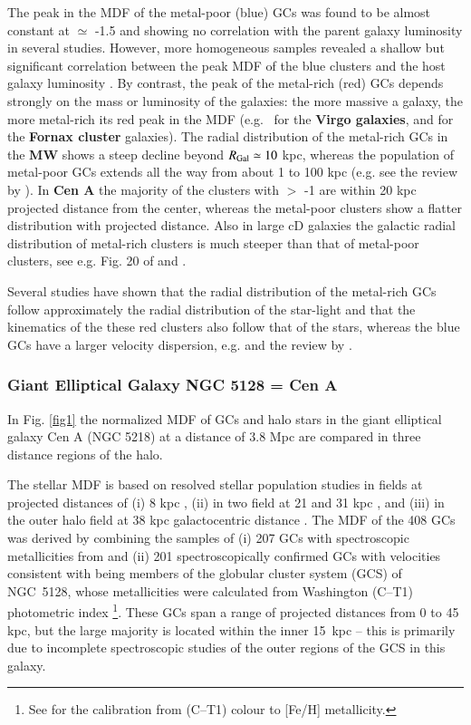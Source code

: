 \documentclass{aa}
\begin{document}
The peak in the MDF of the metal-poor (blue) GCs was found to be 
almost constant at \FeH $\simeq$ -1.5 \citep{burgarella01} and showing no correlation 
with the parent galaxy luminosity \citep{forbes97} in several studies. However, more homogeneous
samples revealed a shallow but significant correlation between the peak MDF of the 
blue clusters and the host galaxy luminosity \citep[e.g.]{larsen01,strader04,peng06}. 
By contrast, 
the peak of the metal-rich (red) GCs depends strongly
on the mass or luminosity of the galaxies: 
the more massive a galaxy, the more metal-rich its red peak in the MDF 
(e.g.\  
\citet{peng06} for the {\bf Virgo galaxies}, and \citet{liu11} for the {\bf Fornax cluster} galaxies). 
The radial distribution of the metal-rich GCs in the {\bf MW} shows a steep decline beyond 
$R_{\rm Gal} \simeq 10$ kpc, whereas the population of metal-poor GCs extends all the way from 
about 1 to 100 kpc (e.g. see the review by \citet{harris01a}).
In {\bf Cen A} the majority of the clusters with \FeH $>$ -1 are within 20 kpc projected distance from the center,
whereas the metal-poor clusters show a flatter distribution with projected distance.
Also in large cD galaxies the galactic radial distribution of metal-rich clusters is much steeper than that of metal-poor clusters, see e.g. Fig. 20 of \citet{harris16} and \citet{harris17a}.

Several studies have shown that the radial distribution of the metal-rich GCs follow approximately 
the radial distribution of the star-light and that the kinematics of the these red clusters also follow that
of the stars, whereas the blue GCs have a larger velocity dispersion,  
e.g.  \citet{schuberth10, strader11, pota13} and the review by \citet{brodie06}. 



\subsubsection{Giant Elliptical Galaxy NGC 5128 = Cen A}
\label{sec:cenA}

In Fig. \ref{fig1} the normalized MDF of GCs and halo stars in the giant elliptical galaxy 
Cen A (NGC 5218) at a distance of 3.8 Mpc \citep{harris10} are compared in three distance regions of the halo. 

The stellar MDF is based on resolved stellar population studies in fields at projected distances 
of (i) 8 kpc \citep{harrisharris02}, (ii) in two field at 21 and 31 kpc  \citep{harris99, harris00}, and (iii) 
in the outer halo field at 38 kpc galactocentric distance \citep{rejkuba05}. 
The MDF of the 408 GCs was derived by combining the samples of (i) 207 GCs with 
spectroscopic metallicities from \citet{beasley08} and (ii) 201 spectroscopically confirmed GCs with 
velocities consistent with being members of the globular cluster system (GCS) of NGC~5128, whose 
metallicities were calculated from  Washington (C--T1) photometric index \citep{woodley07}\footnote{See \citet{woodley10} for the  
calibration from (C--T1) colour to [Fe/H] metallicity.}. These GCs span a range of projected distances from 0 to 45 kpc, but 
the large majority is located within the inner 15~kpc -- this is primarily due to incomplete spectroscopic studies of
the outer regions of the GCS in this galaxy. 
\end{document}
